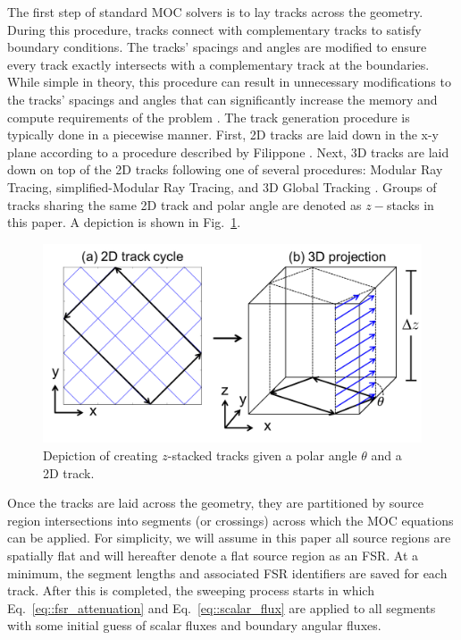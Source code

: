 The first step of standard MOC solvers is to lay tracks across the geometry. During this procedure, tracks connect with complementary tracks to satisfy boundary conditions. The tracks' spacings and angles are modified to ensure every track exactly intersects with a complementary track at the boundaries. While simple in theory, this procedure can result in unnecessary modifications to the tracks' spacings and angles that can significantly increase the memory and compute requirements of the problem \cite{sam_old}. The track generation procedure is typically done in a piecewise manner. First, 2D tracks are laid down in the x-y plane according to a procedure described by Filippone \cite{filippone}. Next, 3D tracks are laid down on top of the 2D tracks following one of several procedures: Modular Ray Tracing, simplified-Modular Ray Tracing, and 3D Global Tracking \cite{sam_old, kochunas}. Groups of tracks sharing the same 2D track and polar angle are denoted as $z-$stacks in this paper. A depiction is shown in Fig.~\ref{fig::3D_tracks}.

\begin{figure}[ht!]
	\centering
	\includegraphics[width=0.75\linewidth]{figures/ph2016/3DMOC_stack.png}
	\caption{Depiction of creating $z$-stacked tracks given a polar angle $\theta$ and a 2D track.}
	\label{fig::3D_tracks}
\end{figure}

Once the tracks are laid across the geometry, they are partitioned by source region intersections into segments (or crossings) across which the MOC equations can be applied. For simplicity, we will assume in this paper all source regions are spatially flat and will hereafter denote a flat source region as an FSR. At a minimum, the segment lengths and associated FSR identifiers are saved for each track. After this is completed, the sweeping process starts in which Eq.~\ref{eq::fsr_attenuation} and Eq.~\ref{eq::scalar_flux} are applied to all segments with some initial guess of scalar fluxes and boundary angular fluxes. 

